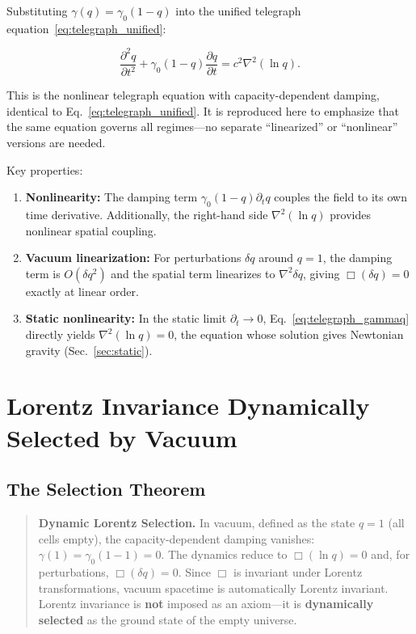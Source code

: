 \documentclass[aps,prd,twocolumn,showpacs,superscriptaddress,preprintnumbers]{revtex4-2}
\begin{document}
Substituting $\gamma(q)=\gamma_0(1-q)$ into the unified telegraph equation~\eqref{eq:telegraph_unified}:

\begin{equation}
\boxed{\frac{\partial^2 q}{\partial t^2} + \gamma_0(1-q)\frac{\partial q}{\partial t} = c^2\nabla^2(\ln q)}.
\label{eq:telegraph_gammaq}
\end{equation}

This is the nonlinear telegraph equation with capacity-dependent damping, identical to Eq.~\eqref{eq:telegraph_unified}.
It is reproduced here to emphasize that the same equation governs all regimes---no separate ``linearized'' or ``nonlinear'' versions are needed.

Key properties:
\begin{enumerate}
    \item \textbf{Nonlinearity:} The damping term $\gamma_0(1-q)\partial_t q$ couples the field to its own time derivative. Additionally, the right-hand side $\nabla^2(\ln q)$ provides nonlinear spatial coupling.
    \item \textbf{Vacuum linearization:} For perturbations $\delta q$ around $q=1$, the damping term is $O(\delta q^2)$ and the spatial term linearizes to $\nabla^2\delta q$, giving $\Box(\delta q)=0$ exactly at linear order.
    \item \textbf{Static nonlinearity:} In the static limit $\partial_t\to0$, Eq.~\eqref{eq:telegraph_gammaq} directly yields $\nabla^2(\ln q)=0$, the equation whose solution gives Newtonian gravity (Sec.~\ref{sec:static}).
\end{enumerate}

\section{Lorentz Invariance Dynamically Selected by Vacuum}
\label{sec:lorentz}

\subsection{The Selection Theorem}

\begin{quote}
\textbf{Dynamic Lorentz Selection.}
In vacuum, defined as the state $q=1$ (all cells empty), the capacity-dependent damping vanishes: $\gamma(1)=\gamma_0(1-1)=0$.
The dynamics reduce to $\Box(\ln q)=0$ and, for perturbations, $\Box(\delta q)=0$.
Since $\Box$ is invariant under Lorentz transformations, vacuum spacetime is automatically Lorentz invariant.
Lorentz invariance is \textbf{not} imposed as an axiom---it is \textbf{dynamically selected} as the ground state of the empty universe.
\end{quote}
\end{document}
